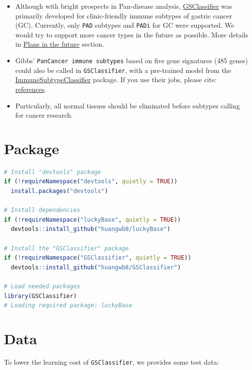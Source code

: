 \documentclass[
  12pt,
]{book}
\newcommand{\passthrough}[1]{#1}
\providecommand{\tightlist}{%
  \setlength{\itemsep}{0pt}\setlength{\parskip}{0pt}}
\begin{document}
\begin{itemize}
\tightlist
\item
  Although with bright prospects in Pan-disease analysis, \href{https://github.com/huangwb8/GSClassifier}{GSClassifier} was primarily developed for clinic-friendly immune subtypes of gastric cancer (GC). Currently, only \passthrough{\lstinline!PAD!} subtypes and \passthrough{\lstinline!PADi!} for GC were supported. We would try to support more cancer types in the future as possible. More details in \href{https://github.com/huangwb8/GSClassifier/wiki/Plans-in-the-future}{Plans in the future} section.
\item
  Gibbs' \passthrough{\lstinline!PanCancer immune subtypes!} based on five gene signatures (485 genes) could also be called in \passthrough{\lstinline!GSClassifier!}, with a pre-trained model from the \href{https://github.com/CRI-iAtlas/ImmuneSubtypeClassifier}{ImmuneSubtypeClassifier} package. If you use their jobs, please cite: \href{https://github.com/huangwb8/GSClassifier/wiki/Introduction\#Reference}{references}.
\item
  Particularly, all normal tissues should be eliminated before subtypes calling for cancer research.
\end{itemize}

\hypertarget{package}{%
\section{Package}\label{package}}

\begin{lstlisting}[language=R]
# Install "devtools" package
if (!requireNamespace("devtools", quietly = TRUE))
  install.packages("devtools")

# Install dependencies
if (!requireNamespace("luckyBase", quietly = TRUE))
  devtools::install_github("huangwb8/luckyBase")

# Install the "GSClassifier" package
if (!requireNamespace("GSClassifier", quietly = TRUE))
  devtools::install_github("huangwb8/GSClassifier")

# Load needed packages
library(GSClassifier)
# Loading required package: luckyBase
\end{lstlisting}

\hypertarget{data}{%
\section{Data}\label{data}}

To lower the learning cost of \passthrough{\lstinline!GSClassifier!}, we provides some test data:
\end{document}
